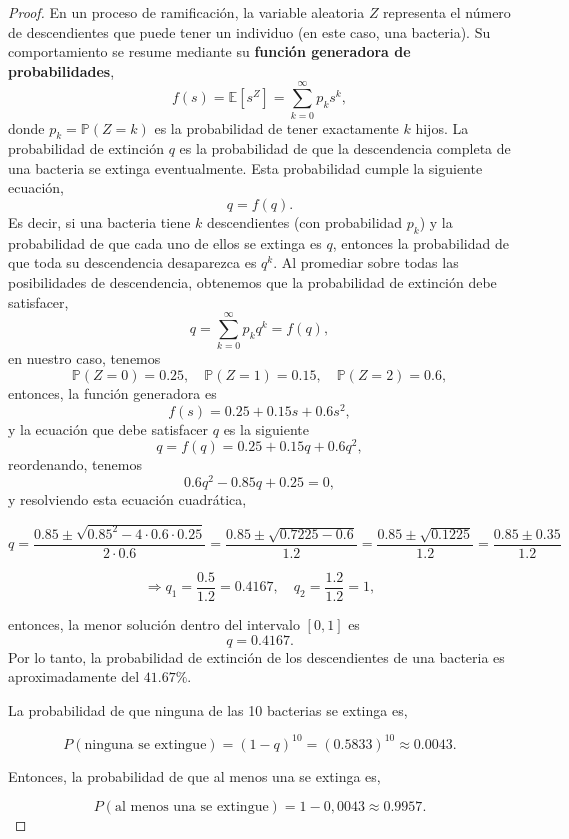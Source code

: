 \documentclass{article}
\begin{document}
\begin{proof}
\item[(b)] En un proceso de ramificación, la variable aleatoria \( Z \) representa el número de descendientes que puede tener un individuo (en este caso, una bacteria). Su comportamiento se resume mediante su \textbf{función generadora de probabilidades},
\[
f(s) = \mathbb{E}[s^Z] = \sum_{k=0}^{\infty} p_k s^k,
\]
donde \( p_k = \mathbb{P}(Z = k) \) es la probabilidad de tener exactamente \( k \) hijos.
La probabilidad de extinción \( q \) es la probabilidad de que la descendencia completa de una bacteria se extinga eventualmente. Esta probabilidad cumple la siguiente ecuación,
\[
q = f(q).
\]
Es decir, si una bacteria tiene \( k \) descendientes (con probabilidad \( p_k \)) y la probabilidad de que cada uno de ellos se extinga es \( q \), entonces la probabilidad de que toda su descendencia desaparezca es \( q^k \). Al promediar sobre todas las posibilidades de descendencia, obtenemos que la probabilidad de extinción debe satisfacer,
\[
q = \sum_{k=0}^{\infty} p_k q^k = f(q),
\]
en nuestro caso, tenemos
\[
\mathbb{P}(Z = 0) = 0.25, \quad \mathbb{P}(Z = 1) = 0.15, \quad \mathbb{P}(Z = 2) = 0.6,
\]
entonces, la función generadora es
\[
f(s) = 0.25 + 0.15s + 0.6s^2,
\]
y la ecuación que debe satisfacer \( q \) es la siguiente
\[
q = f(q) = 0.25 + 0.15q + 0.6q^2,
\]
reordenando, tenemos
\[
0.6q^2 - 0.85q + 0.25 = 0,
\]
y resolviendo esta ecuación cuadrática, 

\[
q = \frac{0.85 \pm \sqrt{0.85^2 - 4 \cdot 0.6 \cdot 0.25}}{2 \cdot 0.6}
= \frac{0.85 \pm \sqrt{0.7225 - 0.6}}{1.2}
= \frac{0.85 \pm \sqrt{0.1225}}{1.2}
= \frac{0.85 \pm 0.35}{1.2}
\]

\[
\Rightarrow q_1 = \frac{0.5}{1.2} = 0.4167, \quad q_2 = \frac{1.2}{1.2} = 1,
\]

entonces, la menor solución dentro del intervalo \( [0, 1] \) es
\[
q = 0.4167.
\]
Por lo tanto, la probabilidad de extinción de los descendientes de una bacteria es aproximadamente del \( 41.67\% \).


\item[(c)] La probabilidad de que ninguna de las 10 bacterias se extinga es,

\[
P(\text{ninguna se extingue}) = (1 - q)^{10} = (0.5833)^{10} \approx 0.0043.
\]

Entonces, la probabilidad de que al menos una se extinga es,

\[
P(\text{al menos una se extingue}) = 1 - 0,0043 \approx 0.9957.
\]
 
\end{proof}
\end{document}
